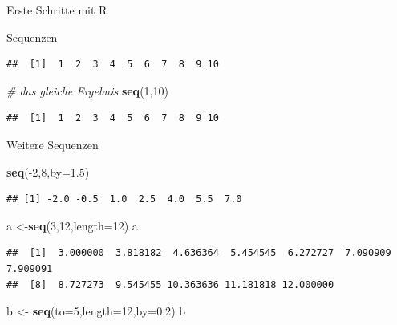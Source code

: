 \documentclass[ignorenonframetext,]{beamer}
\newenvironment{Shaded}{}{}
\newcommand{\KeywordTok}[1]{\textcolor[rgb]{0.00,0.44,0.13}{\textbf{{#1}}}}
\newcommand{\DataTypeTok}[1]{\textcolor[rgb]{0.56,0.13,0.00}{{#1}}}
\newcommand{\DecValTok}[1]{\textcolor[rgb]{0.25,0.63,0.44}{{#1}}}
\newcommand{\FloatTok}[1]{\textcolor[rgb]{0.25,0.63,0.44}{{#1}}}
\newcommand{\StringTok}[1]{\textcolor[rgb]{0.25,0.44,0.63}{{#1}}}
\newcommand{\CommentTok}[1]{\textcolor[rgb]{0.38,0.63,0.69}{\textit{{#1}}}}
\newcommand{\NormalTok}[1]{{#1}}
\begin{document}
\begin{frame}[fragile]{Erste Schritte mit R}
\begin{block}{Sequenzen}
\begin{verbatim}
##  [1]  1  2  3  4  5  6  7  8  9 10
\end{verbatim}

\begin{Shaded}
\begin{Highlighting}[]
\CommentTok{# das gleiche Ergebnis}
\KeywordTok{seq}\NormalTok{(}\DecValTok{1}\NormalTok{,}\DecValTok{10}\NormalTok{)}
\end{Highlighting}
\end{Shaded}

\begin{verbatim}
##  [1]  1  2  3  4  5  6  7  8  9 10
\end{verbatim}

\end{block}

\begin{block}{Weitere Sequenzen}

\begin{Shaded}
\begin{Highlighting}[]
\KeywordTok{seq}\NormalTok{(-}\DecValTok{2}\NormalTok{,}\DecValTok{8}\NormalTok{,}\DataTypeTok{by=}\FloatTok{1.5}\NormalTok{)}
\end{Highlighting}
\end{Shaded}

\begin{verbatim}
## [1] -2.0 -0.5  1.0  2.5  4.0  5.5  7.0
\end{verbatim}

\begin{Shaded}
\begin{Highlighting}[]
\NormalTok{a <-}\KeywordTok{seq}\NormalTok{(}\DecValTok{3}\NormalTok{,}\DecValTok{12}\NormalTok{,}\DataTypeTok{length=}\DecValTok{12}\NormalTok{)}
\NormalTok{a}
\end{Highlighting}
\end{Shaded}

\begin{verbatim}
##  [1]  3.000000  3.818182  4.636364  5.454545  6.272727  7.090909  7.909091
##  [8]  8.727273  9.545455 10.363636 11.181818 12.000000
\end{verbatim}

\begin{Shaded}
\begin{Highlighting}[]
\NormalTok{b <-}\StringTok{ }\KeywordTok{seq}\NormalTok{(}\DataTypeTok{to=}\DecValTok{5}\NormalTok{,}\DataTypeTok{length=}\DecValTok{12}\NormalTok{,}\DataTypeTok{by=}\FloatTok{0.2}\NormalTok{)}
\NormalTok{b}
\end{Highlighting}
\end{Shaded}


\end{block}
\end{frame}
\end{document}
